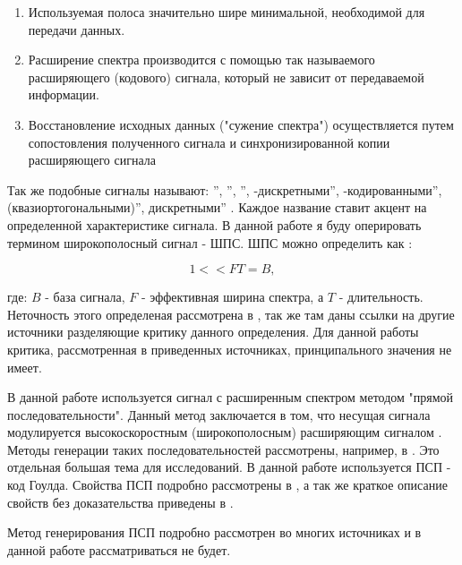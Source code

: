 \begin{enumerate}
	\item Используемая полоса значительно шире минимальной, необходимой для передачи данных.
	\item Расширение спектра производится с помощью так называемого расширяющего (кодового) сигнала,
		который не зависит от передаваемой информации.
	\item Восстановление исходных данных ("сужение спектра") осуществляется путем сопостовления полученного
		сигнала и синхронизированной копии расширяющего сигнала
\end{enumerate}
Так же подобные сигналы называют:
\textquotedblright,
\textquotedblright,
\textquotedblright,
-дискретными\textquotedblright,
-кодированными\textquotedblright,
 (квазиортогональными)\textquotedblright,
 дискретными\textquotedblright
\cite{gantmaher-book}.
Каждое название ставит акцент на определенной характеристике сигнала. В данной работе я буду оперировать термином
широкополосный сигнал - ШПС. ШПС можно определить как \cite{gantmaher-book, varakin-book}:

\begin{center}
\begin{equation}
	\label{eq:ss_signal}
	1 << FT = B,
\end{equation}
\end{center}
где: ${B}$ - база сигнала, ${F}$ - эффективная ширина спектра, а ${T}$ - длительность.
Неточность этого определеная рассмотрена в \cite{gantmaher-book}, так же там даны ссылки на другие источники
разделяющие критику данного определения. Для данной работы критика, рассмотренная в приведенных источниках,
принципального значения не имеет.

В данной работе используется сигнал с расширенным спектром методом "прямой последовательности". Данный метод
заключается в том, что несущая сигнала модулируется высокоскоростным (широкополосным) расширяющим сигналом \cite{sklyar}.
Методы генерации таких последовательностей рассмотрены, например, в \cite{gantmaher-book}. Это отдельная большая
тема для исследований. В данной работе используется ПСП - код Гоулда. Свойства ПСП подробно рассмотрены в
\cite{gold-ieee}, а так же краткое описание свойств без доказательства приведены в \cite{tsui, akos-book}.

Метод генерирования ПСП подробно рассмотрен во многих источниках \cite{tsui, akos-book, kaplan}
и в данной работе рассматриваться не будет.

